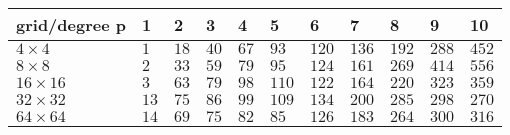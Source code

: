 \begin{tabular}{lllllllllll}
\hline
 grid/degree p   & 1    & 2    & 3    & 4    & 5     & 6     & 7     & 8     & 9     & 10    \\
\hline
 $4 \times 4$    & $1$  & $18$ & $40$ & $67$ & $93$  & $120$ & $136$ & $192$ & $288$ & $452$ \\
 $8 \times 8$    & $2$  & $33$ & $59$ & $79$ & $95$  & $124$ & $161$ & $269$ & $414$ & $556$ \\
 $16 \times 16$  & $3$  & $63$ & $79$ & $98$ & $110$ & $122$ & $164$ & $220$ & $323$ & $359$ \\
 $32 \times 32$  & $13$ & $75$ & $86$ & $99$ & $109$ & $134$ & $200$ & $285$ & $298$ & $270$ \\
 $64 \times 64$  & $14$ & $69$ & $75$ & $82$ & $85$  & $126$ & $183$ & $264$ & $300$ & $316$ \\
\hline
\end{tabular}